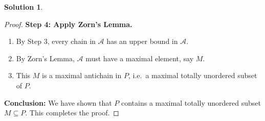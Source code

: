 \documentclass[12pt]{article}
\theoremstyle{definition} %
\newtheorem{solution}{Solution}
\theoremstyle{plain} %
\begin{document}
\begin{solution}
\begin{proof}
        \noindent
        \textbf{Step 4: Apply Zorn's Lemma.}
        \begin{enumerate}
            \item By Step 3, every chain in $\mathcal{A}$ has an upper bound in $\mathcal{A}$.
            \item By Zorn's Lemma, $\mathcal{A}$ must have a maximal element, say $M$.
            \item This $M$ is a maximal antichain in $P$, i.e.\ a maximal totally unordered subset of $P$.
        \end{enumerate}
        
        \noindent
        \textbf{Conclusion:} We have shown that $P$ contains a maximal totally unordered subset $M \subseteq P$. This completes the proof.
        
        \end{proof}
    
    
\end{solution}
\end{document}
